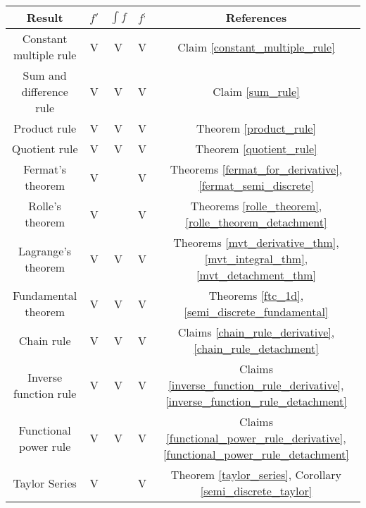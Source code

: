 \documentclass[11pt]{book}
\begin{document}
\begin{table}[h!]
\centering
        \begin{tabular}{ccccc}
        \toprule
        \textbf{Result} & \color[HTML]{FFA006} \textbf{$f'$} & \color[HTML]{7800cf} \textbf{$\int f$} & \color[HTML]{0039BD} \textbf{$f^;$} & \textbf{References} \\
        \midrule
        Constant multiple rule & \color[HTML]{FFA006} V & \color[HTML]{7800cf} V & \color[HTML]{0039BD} V & Claim \ref{constant_multiple_rule} \\
        Sum and difference rule & \color[HTML]{FFA006} V & \color[HTML]{7800cf} V & \color[HTML]{0039BD} V & Claim \ref{sum_rule} \\
        Product rule & \color[HTML]{FFA006} V & \color[HTML]{7800cf} V & \color[HTML]{0039BD} V & Theorem \ref{product_rule} \\
        Quotient rule & \color[HTML]{FFA006} V & \color[HTML]{7800cf} V & \color[HTML]{0039BD} V & Theorem  \ref{quotient_rule} \\
        Fermat's theorem & \color[HTML]{FFA006} V &  & \color[HTML]{0039BD} V & Theorems  \ref{fermat_for_derivative}, \ref{fermat_semi_discrete} \\
        Rolle's theorem & \color[HTML]{FFA006} V &  & \color[HTML]{0039BD} V & Theorems \ref{rolle_theorem}, \ref{rolle_theorem_detachment} \\
        Lagrange's theorem & \color[HTML]{FFA006} V & \color[HTML]{7800cf} V & \color[HTML]{0039BD} V & Theorems \ref{mvt_derivative_thm}, \ref{mvt_integral_thm}, \ref{mvt_detachment_thm} \\
        Fundamental theorem & \color[HTML]{FFA006} V & \color[HTML]{7800cf} V & \color[HTML]{0039BD} V & Theorems \ref{ftc_1d}, \ref{semi_discrete_fundamental} \\
        Chain rule & \color[HTML]{FFA006} V & \color[HTML]{7800cf} V & \color[HTML]{0039BD} V & Claims \ref{chain_rule_derivative}, \ref{chain_rule_detachment} \\
        Inverse function rule & \color[HTML]{FFA006} V & \color[HTML]{7800cf} V & \color[HTML]{0039BD} V & Claims \ref{inverse_function_rule_derivative}, \ref{inverse_function_rule_detachment} \\
        Functional power rule & \color[HTML]{FFA006} V & \color[HTML]{7800cf} V & \color[HTML]{0039BD} V & Claims \ref{functional_power_rule_derivative}, \ref{functional_power_rule_detachment} \\
        Taylor Series & \color[HTML]{FFA006} V & & \color[HTML]{0039BD} V & Theorem \ref{taylor_series}, Corollary \ref{semi_discrete_taylor} \\

\end{tabular}
\end{table}
\end{document}
